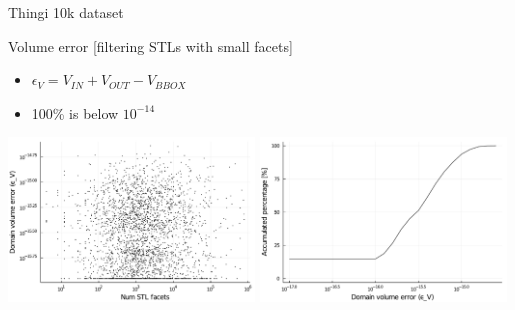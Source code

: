 \documentclass{beamer}
\begin{document}
\begin{frame}{Thingi 10k dataset}

  \begin{block}{Volume error [filtering STLs with small facets]}
  \begin{itemize}
    \item
      $\epsilon_V = V_{IN} + V_{OUT} - V_{BBOX}$
    \item
      100\% is below $10^{-14}$
  \end{itemize}
  \end{block}

  \includegraphics[width=0.49\textwidth]{../analysis/plots/filter_num_stl_facets_volume_error}
  \includegraphics[width=0.49\textwidth]{../analysis/plots/filter_histogram_volume_error}
\end{frame}
\end{document}
